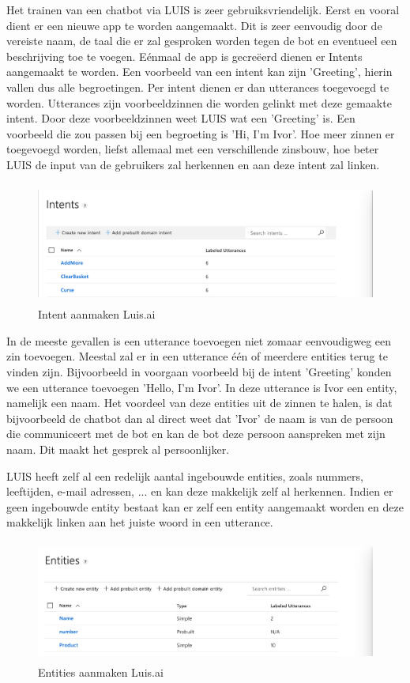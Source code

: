 Het trainen van een chatbot via LUIS is zeer gebruiksvriendelijk. Eerst en vooral dient er een nieuwe app te worden aangemaakt. Dit is zeer eenvoudig door de vereiste naam, de taal die er zal gesproken worden tegen de bot en eventueel een beschrijving toe te voegen. Eénmaal de app is gecreëerd dienen er Intents aangemaakt te worden. Een voorbeeld van een intent kan zijn 'Greeting', hierin vallen dus alle begroetingen. Per intent dienen er dan utterances toegevoegd te worden. Utterances zijn voorbeeldzinnen die worden gelinkt met deze gemaakte intent. Door deze voorbeeldzinnen weet LUIS wat een 'Greeting' is. Een voorbeeld die zou passen bij een begroeting is 'Hi, I'm Ivor'. Hoe meer zinnen er toegevoegd worden, liefst allemaal met een verschillende zinsbouw, hoe beter LUIS de input van de gebruikers zal herkennen en aan deze intent zal linken.


\begin{figure}[h!]
	\centering
	\includegraphics[height=4cm]{img/intents.png}
	\caption{Intent aanmaken Luis.ai}
	\label{fig:intents}
\end{figure}

In de meeste gevallen is een utterance toevoegen niet zomaar eenvoudigweg een zin toevoegen. Meestal zal er in een utterance één of meerdere entities terug te vinden zijn. Bijvoorbeeld in voorgaan voorbeeld bij de intent 'Greeting' konden we een utterance toevoegen 'Hello, I'm Ivor'. In deze utterance is Ivor een entity, namelijk een naam. Het voordeel van deze entities uit de zinnen te halen, is dat bijvoorbeeld de chatbot dan al direct weet dat 'Ivor' de naam is van de persoon die communiceert met de bot en kan de bot deze persoon aanspreken met zijn naam. Dit maakt het gesprek al persoonlijker.

LUIS heeft zelf al een redelijk aantal ingebouwde entities, zoals nummers, leeftijden, e-mail adressen, ... en kan deze makkelijk zelf al herkennen. Indien er geen ingebouwde entity bestaat kan er zelf een entity aangemaakt worden en deze makkelijk linken aan het juiste woord in een utterance.

\begin{figure}[h!]
	\centering
	\includegraphics[height=4cm]{img/entity.png}
	\caption{Entities aanmaken Luis.ai}
	\label{fig:entity}
\end{figure}

